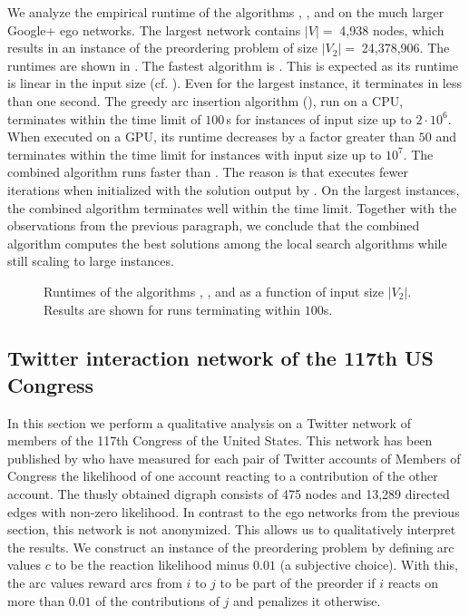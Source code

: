 We analyze the empirical runtime of the algorithms , , and  on the much larger Google+ ego networks.
The largest network contains $|V| =\;$4,938 nodes, which results in an instance of the preordering problem of size $|V_2| =\;$24,378,906.
The runtimes are shown in .
The fastest algorithm is .
This is expected as its runtime is linear in the input size (cf. ).
Even for the largest instance, it terminates in less than one second.
The greedy arc insertion algorithm (), run on a CPU, terminates within the time limit of $100\,$s for instances of input size up to $2 \cdot 10^6$.
When executed on a GPU, its runtime decreases by a factor greater than $50$ and terminates within the time limit for instances with input size up to $10^7$.
The combined algorithm  runs faster than .
The reason is that  executes fewer iterations when initialized with the solution output by .
On the largest instances, the combined algorithm terminates well within the time limit. 
Together with the observations from the previous paragraph, we conclude that the combined algorithm  computes the best solutions among the local search algorithms while still scaling to large instances.

\begin{figure}
    \centering
    
    \caption{Runtimes of the algorithms , , and  as a function of input size $|V_2|$.
    Results are shown for runs terminating within $100$s.}
    \label{fig:local-search}
\end{figure}




\subsection{Twitter interaction network of the 117th US Congress}

In this section we perform a qualitative analysis on a Twitter network of members of the 117th Congress of the United States.
This network has been published by \citet{fink2023centrality} who have measured for each pair of Twitter accounts of Members of Congress the likelihood of one account reacting to a contribution of the other account.
The thusly obtained digraph consists of 475 nodes and 13,289 directed edges with non-zero likelihood.
In contrast to the ego networks from the previous section, this network is not anonymized.
This allows us to qualitatively interpret the results.
We construct an instance of the preordering problem by defining arc values $c$ to be the reaction likelihood minus $0.01$ (a subjective choice).
With this, the arc values reward arcs from $i$ to $j$ to be part of the preorder if $i$ reacts on more than $0.01$ of the contributions of $j$ and penalizes it otherwise.

